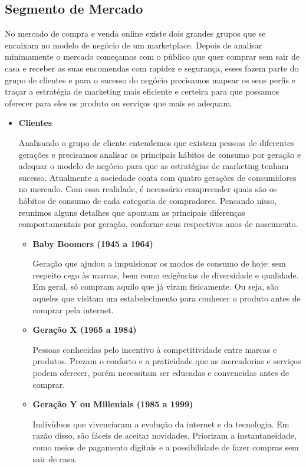 \documentclass[a4paper]{article}
\begin{document}
\subsection{Segmento de Mercado}
\par No mercado de compra e venda online existe dois grandes grupos que se encaixam no modelo de negócio de um marketplace. Depois de analisar minimamente o mercado começamos com o público que quer comprar sem sair de casa e receber as suas encomendas com rapidez e segurança, esses fazem parte do grupo de clientes e para o sucesso do negócio precisamos mapear os seus perfis e traçar a estratégia de marketing mais eficiente e certeira para que possamos oferecer para eles os produto ou serviços que mais se adequam. 
\begin{itemize}
    \item \textbf{{Clientes}}
    \par Analisando o grupo de cliente entendemos que existem pessoas de diferentes gerações e precisamos analisar os principais hábitos de consumo por geração e adequar o modelo de negócio para que as estratégias de marketing tenham sucesso. Atualmente a sociedade conta com quatro gerações de consumidores no mercado. Com essa realidade, é necessário compreender quais são os hábitos de consumo de cada categoria de compradores. Pensando nisso, reunimos alguns detalhes que apontam as principais diferenças comportamentais por geração, conforme seus respectivos anos de nascimento.
    \begin{itemize}
        \item \textbf{Baby Boomers (1945 a 1964)}
        \par Geração que ajudou a impulsionar os modos de consumo de hoje: sem respeito cego às marcas, bem como exigências de diversidade e qualidade. Em geral, só compram aquilo que já viram fisicamente. Ou seja, são aqueles que visitam um estabelecimento para conhecer o produto antes de comprar pela internet.
        \item \textbf{Geração X (1965 a 1984)}
        \par Pessoas conhecidas pelo incentivo à competitividade entre marcas e produtos. Prezam o conforto e a praticidade que as mercadorias e serviços podem oferecer, porém necessitam ser educadas e convencidas antes de comprar.
        \item \textbf{Geração Y ou Millenials (1985 a 1999)}
        \par Indivíduos que vivenciaram a evolução da internet e da tecnologia. Em razão disso, são fáceis de aceitar novidades. Priorizam a instantaneidade, como meios de pagamento digitais e a possibilidade de fazer compras sem sair de casa.

\end{itemize}
\end{itemize}
\end{document}
